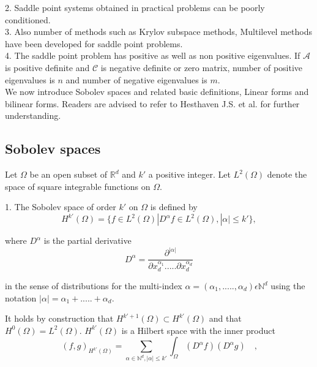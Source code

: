 \documentclass[a4paper,twoside,openright]{book}
\begin{document}
\begin{appendices}
2. Saddle point systems obtained in practical problems can be poorly conditioned.\\

3. Also number of methods such as Krylov subspace methods, Multilevel methods have been developed for saddle point problems.\\

4. The saddle point problem has positive as well as non positive eigenvalues. If $\mathcal{A}$ is positive definite and $\mathcal{C}$ is negative definite or zero matrix, number of positive eigenvalues is $n$ and number of negative eigenvalues is $m$. \\

We now introduce Sobolev spaces and related basic definitions, Linear forms and bilinear forms. Readers are advised to refer to Hesthaven J.S. et al.\cite{crbm} for further understanding.

\subsection{Sobolev spaces} 

Let $\Omega$ be an open subset of $\mathbb{R}^d$ and $k'$ a positive integer. Let $L^2(\Omega)$ denote the space of square integrable functions on $\Omega$. 

1. The Sobolev space of order $k'$ on $\Omega$ is defined by\\
\begin{equation}
H^{k'} (\Omega) = \lbrace f \in L^2 (\Omega) | D^\alpha f \in L^2 (\Omega), |\alpha| \leq k' \rbrace ,
\end{equation} 

where $D^\alpha$ is the partial derivative
\begin{equation}
D^\alpha = \frac{\partial^{|\alpha|}}{\partial x_d^{\alpha_1} ..... \partial x_d^{\alpha_d}}
\end{equation}

in the sense of distributions for the multi-index $\alpha = (\alpha_1,.....,\alpha_d) \epsilon \mathbb{N}^d$ using the notation $|\alpha| = \alpha_1 + ..... + \alpha_d $.

It holds by construction that $H^{k'+1}(\Omega) \subset H^{k'} (\Omega)$ and that $H^0 (\Omega) = L^2 (\Omega)$. $H^{k'}(\Omega)$ is a Hilbert space with the inner product
\begin{equation}
(f,g)_{H^{k'}(\Omega)} = \sum_{\alpha \in \mathbb{N}^d, |\alpha| \leq k'} \int_\Omega (D^\alpha f) (D^\alpha g) \quad \textrm{,}
\end{equation}


\end{appendices}
\end{document}
